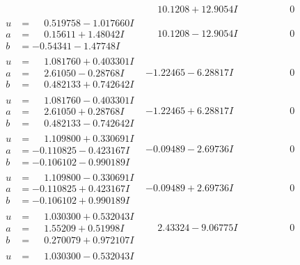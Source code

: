 \documentclass[1p]{elsarticle_modified}
\theoremstyle{definition}
\begin{document}
$$\begin{array}{c|c|c}
 & \phantom{-}10.1208 + 12.9054 I & \phantom{-0.000000 } 0 \\ \hline\begin{aligned}
u &= \phantom{-}0.519758 - 1.017660 I \\
a &= \phantom{-}0.15611 + 1.48042 I \\
b &= -0.54341 - 1.47748 I\end{aligned}
 & \phantom{-}10.1208 - 12.9054 I & \phantom{-0.000000 } 0 \\ \hline\begin{aligned}
u &= \phantom{-}1.081760 + 0.403301 I \\
a &= \phantom{-}2.61050 - 0.28768 I \\
b &= \phantom{-}0.482133 + 0.742642 I\end{aligned}
 & -1.22465 - 6.28817 I & \phantom{-0.000000 } 0 \\ \hline\begin{aligned}
u &= \phantom{-}1.081760 - 0.403301 I \\
a &= \phantom{-}2.61050 + 0.28768 I \\
b &= \phantom{-}0.482133 - 0.742642 I\end{aligned}
 & -1.22465 + 6.28817 I & \phantom{-0.000000 } 0 \\ \hline\begin{aligned}
u &= \phantom{-}1.109800 + 0.330691 I \\
a &= -0.110825 - 0.423167 I \\
b &= -0.106102 - 0.990189 I\end{aligned}
 & -0.09489 - 2.69736 I & \phantom{-0.000000 } 0 \\ \hline\begin{aligned}
u &= \phantom{-}1.109800 - 0.330691 I \\
a &= -0.110825 + 0.423167 I \\
b &= -0.106102 + 0.990189 I\end{aligned}
 & -0.09489 + 2.69736 I & \phantom{-0.000000 } 0 \\ \hline\begin{aligned}
u &= \phantom{-}1.030300 + 0.532043 I \\
a &= \phantom{-}1.55209 + 0.51998 I \\
b &= \phantom{-}0.270079 + 0.972107 I\end{aligned}
 & \phantom{-}2.43324 - 9.06775 I & \phantom{-0.000000 } 0 \\ \hline\begin{aligned}
u &= \phantom{-}1.030300 - 0.532043 I \\

\end{aligned}
\end{array}$$
\end{document}
